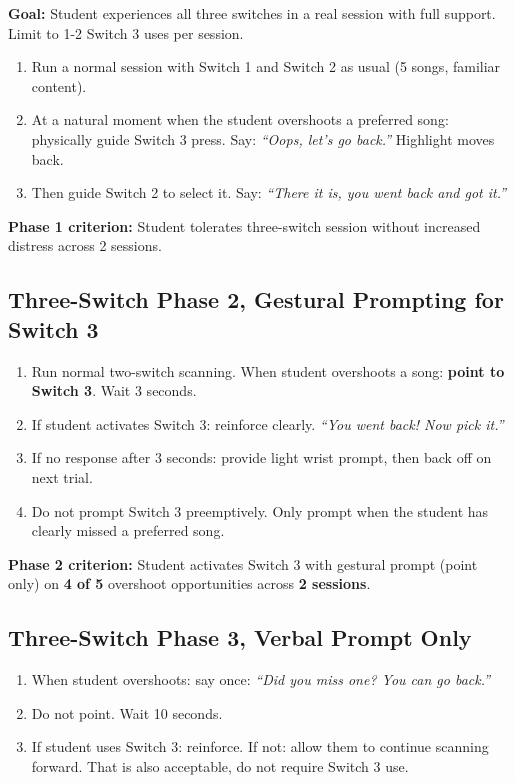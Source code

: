 \documentclass[justified,openright]{tufte-book}
\begin{document}
\textbf{Goal:} Student experiences all three switches in a real session
with full support. Limit to 1-2 Switch 3 uses per session.

\begin{enumerate}
\item
  Run a normal session with Switch 1 and Switch 2 as usual (5 songs,
  familiar content).
\item
  At a natural moment when the student overshoots a preferred song:
  physically guide Switch 3 press. Say: \emph{``Oops, let's go
  back.''} Highlight moves back.
\item
  Then guide Switch 2 to select it. Say: \emph{``There it is, you
  went back and got it.''}
\end{enumerate}

\textbf{Phase 1 criterion:} Student tolerates three-switch session
without increased distress across 2 sessions.

\subsection{Three-Switch Phase 2, Gestural Prompting for Switch
3}\label{three-switch-phase-2-gestural-prompting-for-switch-3}

\begin{enumerate}
\item
  Run normal two-switch scanning. When student overshoots a song:
  \textbf{point to Switch 3}. Wait 3 seconds.
\item
  If student activates Switch 3: reinforce clearly. \emph{``You went
  back! Now pick it.''}
\item
  If no response after 3 seconds: provide light wrist prompt, then back
  off on next trial.
\item
  Do not prompt Switch 3 preemptively. Only prompt when the student has
  clearly missed a preferred song.
\end{enumerate}

\textbf{Phase 2 criterion:} Student activates Switch 3 with gestural
prompt (point only) on \textbf{4 of 5} overshoot opportunities across
\textbf{2 sessions}.

\subsection{Three-Switch Phase 3, Verbal Prompt
Only}\label{three-switch-phase-3-verbal-prompt-only}

\begin{enumerate}
\item
  When student overshoots: say once: \emph{``Did you miss one? You can
  go back.''}
\item
  Do not point. Wait 10 seconds.
\item
  If student uses Switch 3: reinforce. If not: allow them to continue
  scanning forward. That is also acceptable, do not require Switch 3
  use.
\end{enumerate}
\end{document}
